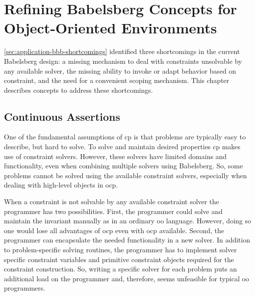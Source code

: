 \chapter{Refining Babelsberg Concepts for Object-Oriented Environments}
\label{cha:design}

\autoref{sec:application-bbb-shortcomings} identified three shortcomings in the current Babelsberg design: a missing mechanism to deal with constraints unsolvable by any available solver, the missing ability to invoke or adapt behavior based on constraint, and the need for a convenient scoping mechanism.
This chapter describes concepts to address these shortcomings.

\section{Continuous Assertions}
\label{sec:design-continuousassertions}
One of the fundamental assumptions of \gls{cp} is that problems are typically easy to describe, but hard to solve. To solve and maintain desired properties \gls{cp} makes use of constraint solvers. However, these solvers have limited domains and functionality, even when combining multiple solvers using Babelsberg.
So, some problems cannot be solved using the available constraint solvers, especially when dealing with high-level objects in \gls{ocp}.

When a constraint is not solvable by any available constraint solver the programmer has two possibilities. First, the programmer could solve and maintain the invariant manually as in an ordinary \gls{oo} language. However, doing so one would lose all advantages of \gls{ocp} even with \gls{ocp} available.
Second, the programmer can encapsulate the needed functionality in a new solver.
In addition to problem-specific solving routines, the programmer has to implement solver specific constraint variables and primitive constraint objects required for the constraint construction.
So, writing a specific solver for each problem puts an additional load on the programmer and, therefore, seems unfeasible for typical \gls{oo} programmers.

